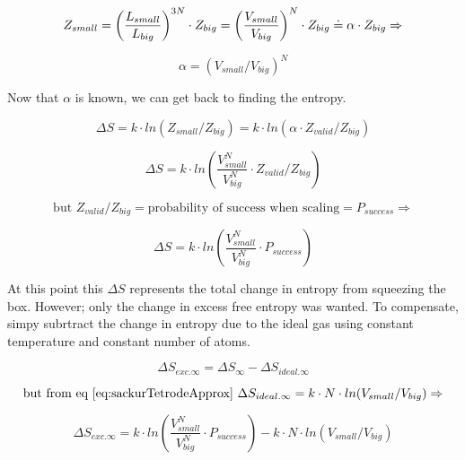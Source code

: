 \begin{equation}\label{eq:MCHS17}
\newline Z_{small}=\left(\frac{L_{small}}{L_{big}}\right)^{3N}\cdot Z_{big}=\left(\frac{V_{small}}{V_{big}}\right)^N\cdot Z_{big}\doteq\alpha\cdot Z_{big} \Rightarrow
\end{equation}

\begin{equation}\label{eq:MCHS18}
\alpha=(V_{small}/V_{big})^N
\end{equation}

Now that $\alpha$ is known, we can get back to finding the entropy.

\begin{equation}\label{eq:MCHS19}
\Delta S=k\cdot ln(Z_{small}/Z_{big})=k\cdot ln(\alpha\cdot Z_{valid}/Z_{big})
\end{equation}

\begin{equation}\label{eq:MCHS20}
\Delta S=k\cdot ln(\frac{V_{small}^N}{V_{big}^N}\cdot Z_{valid}/Z_{big})
\end{equation}

\begin{equation}\label{eq:MCHS21}
\text{but }Z_{valid}/Z_{big}=\text{probability of success when scaling}=P_{success}\Rightarrow
\end{equation}

\begin{equation}\label{eq:MCHS22}
\Delta S=k\cdot ln(\frac{V_{small}^N}{V_{big}^N}\cdot P_{success}
)
\end{equation}

At this point this $\Delta S$ represents the total change in entropy from squeezing the box. However; only the change in excess free entropy was wanted. To compensate, simpy subrtract the change in entropy due to the ideal gas using constant temperature and constant number of atoms.

\begin{equation}\label{eq:MCHS23}
\Delta S_{exc.\infty}=\Delta S_{\infty}-\Delta S_{ideal.\infty}
\end{equation}

\begin{equation}\label{eq:MCHS24}
\text{but from eq~\ref{eq:sackurTetrodeApprox} }\Delta S_{ideal.\infty}=k\cdot N\cdot ln(V_{small}/V_{big})\Rightarrow
\end{equation}

\begin{equation}\label{eq:MCHS25}
\Delta S_{exc.\infty}=k\cdot ln(\frac{V_{small}^N}{V_{big}^N}\cdot P_{success})-k\cdot N\cdot ln(V_{small}/V_{big})
\end{equation}

